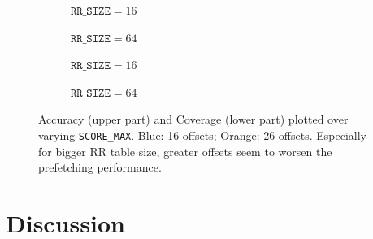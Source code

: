 \documentclass[conference]{IEEEtran}
\begin{document}
\begin{figure}
     \centering
     \begin{subfigure}[b]{0.49\columnwidth}
         \centering
         \resizebox{1.15\columnwidth}{!}{}
         \caption{$\texttt{RR\_SIZE} = 16$}
         \label{subfig:RR=16_Accuracy}
     \end{subfigure}
     \hfill
     \begin{subfigure}[b]{0.49\columnwidth}
         \centering
         \resizebox{1.15\columnwidth}{!}{}
         \caption{$\texttt{RR\_SIZE} = 64$}
         \label{subfig:RR=64_Accuracy}
     \end{subfigure}
     \vfill
     \begin{subfigure}[b]{0.49\columnwidth}
         \centering
         \resizebox{1.15\columnwidth}{!}{}
         \caption{$\texttt{RR\_SIZE} = 16$}
         \label{subfig:RR=16_Coverage}
     \end{subfigure}
     \hfill
     \begin{subfigure}[b]{0.49\columnwidth}
         \centering
         \resizebox{1.15\columnwidth}{!}{}
         \caption{$\texttt{RR\_SIZE} = 64$}
         \label{subfig:RR=64_Coverage}
     \end{subfigure}
     \caption{Accuracy (upper part) and Coverage (lower part) plotted over varying \texttt{SCORE\_MAX}. Blue: 16 offsets; Orange: 26 offsets. Especially for bigger RR table size, greater offsets seem to worsen the prefetching performance.}
     \label{fig:comparision_different_offsets}
\end{figure}

\section{Discussion}


\end{document}

